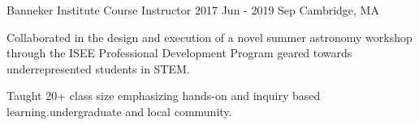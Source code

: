 \begin{cventries}
  \cventry
    {Banneker Institute } %
    {Course Instructor} %
    {2017 Jun - 2019 Sep} %
    {Cambridge, MA} %
    {
      \begin{cvitems} %
        \item Collaborated in the design and execution of a novel summer astronomy workshop through the ISEE Professional Development Program geared towards underrepresented students in STEM.
        \item Taught 20+ class size emphasizing hands-on and inquiry based learning.undergraduate and local community.
      \end{cvitems}
    }

\end{cventries}
